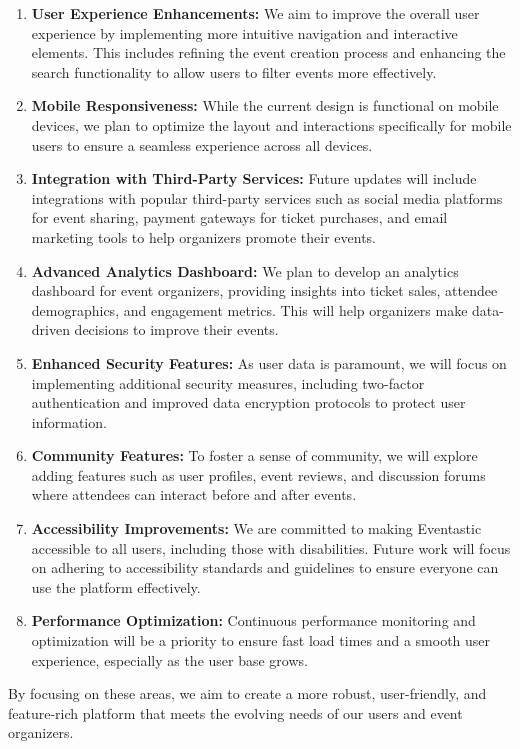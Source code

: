 \begin{enumerate}
    \item \textbf{User Experience Enhancements:} We aim to improve the overall user experience by implementing more intuitive navigation and interactive elements. This includes refining the event creation process and enhancing the search functionality to allow users to filter events more effectively.
    
    \item \textbf{Mobile Responsiveness:} While the current design is functional on mobile devices, we plan to optimize the layout and interactions specifically for mobile users to ensure a seamless experience across all devices.
    
    \item \textbf{Integration with Third-Party Services:} Future updates will include integrations with popular third-party services such as social media platforms for event sharing, payment gateways for ticket purchases, and email marketing tools to help organizers promote their events.
    
    \item \textbf{Advanced Analytics Dashboard:} We plan to develop an analytics dashboard for event organizers, providing insights into ticket sales, attendee demographics, and engagement metrics. This will help organizers make data-driven decisions to improve their events.
    
    \item \textbf{Enhanced Security Features:} As user data is paramount, we will focus on implementing additional security measures, including two-factor authentication and improved data encryption protocols to protect user information.
    
    \item \textbf{Community Features:} To foster a sense of community, we will explore adding features such as user profiles, event reviews, and discussion forums where attendees can interact before and after events.
    
    \item \textbf{Accessibility Improvements:} We are committed to making Eventastic accessible to all users, including those with disabilities. Future work will focus on adhering to accessibility standards and guidelines to ensure everyone can use the platform effectively.
    
    \item \textbf{Performance Optimization:} Continuous performance monitoring and optimization will be a priority to ensure fast load times and a smooth user experience, especially as the user base grows.
\end{enumerate}

By focusing on these areas, we aim to create a more robust, user-friendly, and feature-rich platform that meets the evolving needs of our users and event organizers.
